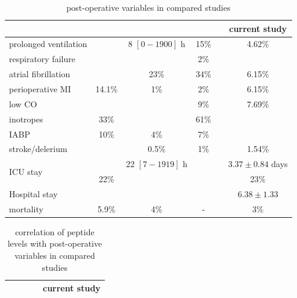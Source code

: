\documentclass[14pt,a4paper,onecolumn]{extarticle}
\begin{document}
\begin{landscape}
\begin{table}
  \small
	\centering
    \caption{post-operative variables in compared studies}
    \begin{tabular}{|l|c|c|c|c|c|}
        \hline
            & \cite{Eliasdottir2008} & \cite{Schachner2010} & \cite{Krzych2011} & \cite{Chen2013} & current study \\
        \hline


        prolonged ventilation &  & 8 $[0-1900]$ h & 15\% &  & 4.62\% \\
        respiratory failure &  &  & 2\% &  &  \\
        atrial fibrillation &  & 23\% & 34\% &  & 6.15\% \\
        perioperative MI & 14.1\% & 1\% & 2\% &  & 6.15\% \\
        low CO &  &  & 9\% &  & 7.69\% \\
        inotropes & 33\% &  & 61\% &  &  \\
        IABP & 10\% & 4\% & 7\% &  &  \\
        stroke/delerium &  & 0.5\% & 1\% &  & 1.54\% \\
        \multirow{2}{*}{ICU stay} &  & 22 $[7-1919]$ h &  &  & $3.37\pm0.84$ days \\
                                  & 22\% &  &  &  & 23\% \\
        Hospital stay &  &  &  &  & $6.38\pm1.33$ \\
        mortality & 5.9\% & 4\% & - &  & 3\% \\

        \hline
    \end{tabular}
    \label{meta_postoperative}
\end{table}
\end{landscape}


\begin{landscape}
\begin{table}
  \small
	\centering
    \caption{correlation of peptide levels with post-operative variables in compared studies}
    \begin{tabular}{|l|c|c|c|c|}
        \hline
            & \cite{Schachner2010} & \cite{Krzych2011} & \cite{Chen2013} & current study \\
        \hline

        \hline
    \end{tabular}
    \label{meta_correlation}
\end{table}
\end{landscape}
\end{document}
